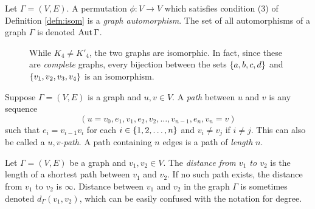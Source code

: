 \documentclass[m3380-lec-main.tex]{subfiles}
\begin{document}
\begin{defn} Let $\Gamma=(V,E)$. A permutation $\phi:V\to V$ which satisfies condition (3) of Definition \ref{defn:isom}{} is a \emph{graph automorphism}. The set of all automorphisms of a graph $\Gamma$ is denoted $\operatorname{Aut}\Gamma$.
\end{defn}

\begin{figure}[hbt]
\begin{center}
 \hspace{2cm}
\end{center}
\caption{While $K_4\neq K'_4$, the two graphs are isomorphic. In fact, since these are \emph{complete} graphs, every bijection between the sets $\left\{a,b,c,d\right\}$ and $\left\{v_1,v_2,v_3,v_4\right\}$ is an isomorphism.}
\end{figure}

\begin{defn} Suppose $\Gamma=(V,E)$ is a graph and $u,v\in V$. A \emph{path} between $u$ and $v$ is any sequence 
\[ (u=v_0, e_1, v_1, e_2, v_2, \ldots, v_{n-1}, e_n, v_n = v)\]
such that $e_i = v_{i-1}v_i$ for each $i\in\left\{1,2,\ldots,n\right\}$ and $v_i\neq v_j$ if $i\neq j$. This can also be called a \emph{$u,v$-path}. A path containing $n$ edges is a path of \emph{length} $n$.
\end{defn}

\begin{defn} Let $\Gamma=(V,E)$ be a graph and $v_1, v_2\in V$. The \emph{distance from $v_1$ to $v_2$} is the length of a shortest path between $v_1$ and $v_2$. If no such path exists, the distance from $v_1$ to $v_2$ is $\infty$. Distance between $v_1$ and $v_2$ in the graph $\Gamma$ is sometimes denoted $d_\Gamma(v_1,v_2)$, which can be easily confused with the notation for degree.
\end{defn}
\end{document}
